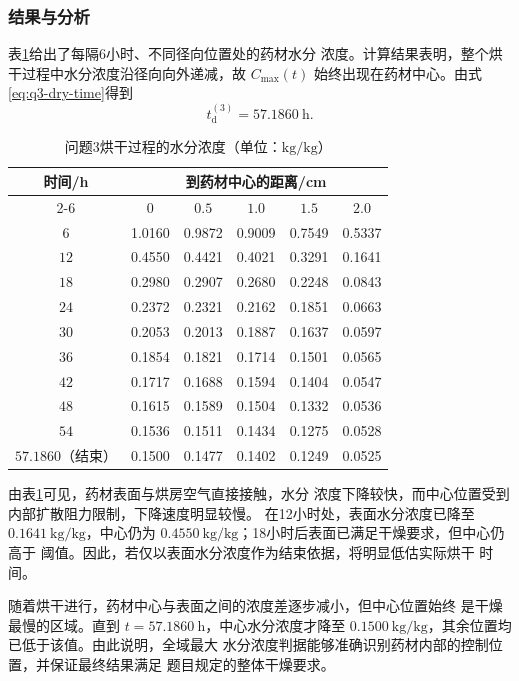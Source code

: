 \documentclass[12pt,a4paper]{article}
\renewcommand{\boxed}[1]{#1}
\begin{document}
\subsubsection{结果与分析}

表\ref{tab:q3-moisture}给出了每隔6小时、不同径向位置处的药材水分
浓度。计算结果表明，整个烘干过程中水分浓度沿径向向外递减，故
$C_{\max}(t)$ 始终出现在药材中心。由式\eqref{eq:q3-dry-time}得到
\begin{equation}
\boxed{t_{\mathrm d}^{(3)}=57.1860\ \mathrm{h}}.
\label{eq:q3-result-time}
\end{equation}

\begin{table}[H]
\centering
\caption{问题3烘干过程的水分浓度（单位：$\mathrm{kg/kg}$）}
\label{tab:q3-moisture}
\begin{tabular}{cccccc}
\toprule
\multirow{2}{*}{时间/h}
& \multicolumn{5}{c}{到药材中心的距离/cm}\\
\cmidrule(lr){2-6}
& $0$ & $0.5$ & $1.0$ & $1.5$ & $2.0$\\
\midrule
$6$  & 1.0160 & 0.9872 & 0.9009 & 0.7549 & 0.5337\\
$12$ & 0.4550 & 0.4421 & 0.4021 & 0.3291 & 0.1641\\
$18$ & 0.2980 & 0.2907 & 0.2680 & 0.2248 & 0.0843\\
$24$ & 0.2372 & 0.2321 & 0.2162 & 0.1851 & 0.0663\\
$30$ & 0.2053 & 0.2013 & 0.1887 & 0.1637 & 0.0597\\
$36$ & 0.1854 & 0.1821 & 0.1714 & 0.1501 & 0.0565\\
$42$ & 0.1717 & 0.1688 & 0.1594 & 0.1404 & 0.0547\\
$48$ & 0.1615 & 0.1589 & 0.1504 & 0.1332 & 0.0536\\
$54$ & 0.1536 & 0.1511 & 0.1434 & 0.1275 & 0.0528\\
$57.1860$（结束） & 0.1500 & 0.1477 & 0.1402 & 0.1249 & 0.0525\\
\bottomrule
\end{tabular}
\end{table}

由表\ref{tab:q3-moisture}可见，药材表面与烘房空气直接接触，水分
浓度下降较快，而中心位置受到内部扩散阻力限制，下降速度明显较慢。
在12小时处，表面水分浓度已降至 $0.1641\ \mathrm{kg/kg}$，中心仍为
$0.4550\ \mathrm{kg/kg}$；18小时后表面已满足干燥要求，但中心仍高于
阈值。因此，若仅以表面水分浓度作为结束依据，将明显低估实际烘干
时间。

随着烘干进行，药材中心与表面之间的浓度差逐步减小，但中心位置始终
是干燥最慢的区域。直到 $t=57.1860\ \mathrm{h}$，中心水分浓度才降至
$0.1500\ \mathrm{kg/kg}$，其余位置均已低于该值。由此说明，全域最大
水分浓度判据能够准确识别药材内部的控制位置，并保证最终结果满足
题目规定的整体干燥要求。
\end{document}
